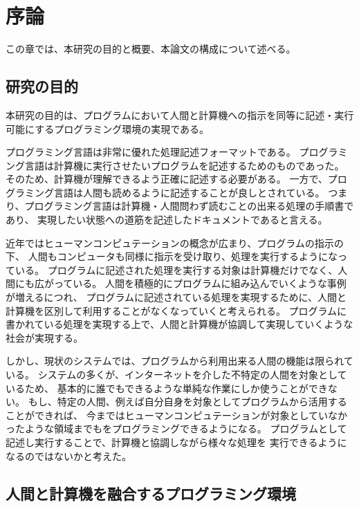 \chapter{序論}\label{chap:introduction}

この章では、本研究の目的と概要、本論文の構成について述べる。

\newpage

\section{研究の目的}\label{ux7814ux7a76ux306eux76eeux7684}

本研究の目的は、プログラムにおいて人間と計算機への指示を同等に記述・実行可能にするプログラミング環境の実現である。

プログラミング言語は非常に優れた処理記述フォーマットである。
プログラミング言語は計算機に実行させたいプログラムを記述するためのものであった。
そのため、計算機が理解できるよう正確に記述する必要がある。
一方で、プログラミング言語は人間も読めるように記述することが良しとされている。
つまり、プログラミング言語は計算機・人間問わず読むことの出来る処理の手順書であり、
実現したい状態への道筋を記述したドキュメントであると言える。

近年ではヒューマンコンピュテーションの概念が広まり、プログラムの指示の下、
人間もコンピュータも同様に指示を受け取り、処理を実行するようになっている。
プログラムに記述された処理を実行する対象は計算機だけでなく、人間にも広がっている。
人間を積極的にプログラムに組み込んでいくような事例が増えるにつれ、
プログラムに記述されている処理を実現するために、人間と計算機を区別して利用することがなくなっていくと考えられる。
プログラムに書かれている処理を実現する上で、人間と計算機が協調して実現していくような
社会が実現する。

しかし、現状のシステムでは、プログラムから利用出来る人間の機能は限られている。
システムの多くが、インターネットを介した不特定の人間を対象としているため、
基本的に誰でもできるような単純な作業にしか使うことができない。
もし、特定の人間、例えば自分自身を対象としてプログラムから活用することができれば、
今まではヒューマンコンピュテーションが対象としていなかったような領域までもをプログラミングできるようになる。
プログラムとして記述し実行することで、計算機と協調しながら様々な処理を
実行できるようになるのではないかと考えた。

\section{人間と計算機を融合するプログラミング環境}\label{ux4ebaux9593ux3068ux8a08ux7b97ux6a5fux3092ux878dux5408ux3059ux308bux30d7ux30edux30b0ux30e9ux30dfux30f3ux30b0ux74b0ux5883}


